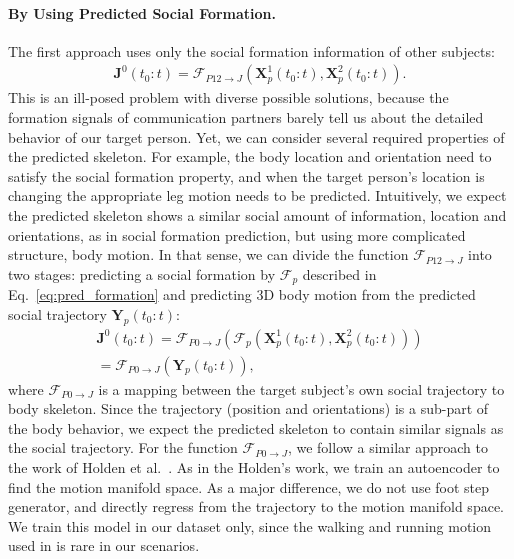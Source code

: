 \paragraph{By Using Predicted Social Formation.} The first approach uses only the social formation information of other subjects:
\begin{gather}	
\mathbf{J}^0(t_0:t) = \mathcal{F}_{P12\rightarrow J} \left( \mathbf{X}_p^1(t_0:t), \mathbf{X}_p^2(t_0:t) \right).
\end{gather}
This is an ill-posed problem with diverse possible solutions, because the formation signals of communication partners barely tell us about the detailed behavior of our target person. Yet, we can consider several required properties of the predicted skeleton. For example, the body location and orientation need to satisfy the social formation property, and when the target person's location is changing the appropriate leg motion needs to be predicted. Intuitively, we expect the predicted skeleton shows a similar social amount of information, location and orientations, as in social formation prediction, but using more complicated structure, body motion. In that sense, we can divide the function $\mathcal{F}_{P12\rightarrow J}$ into two stages: predicting a social formation by $\mathcal{F}_p$ described in Eq.~\ref{eq:pred_formation} and predicting 3D body motion from the predicted social trajectory $\mathbf{Y}_p (t_0:t)$:
\begin{gather}	
\mathbf{J}^0 (t_0:t) = \mathcal{F}_{P0\rightarrow J} \left(   \mathcal{F}_p \left( \mathbf{X}_p^1(t_0:t), \mathbf{X}_p^2(t_0:t) \right) \right) \nonumber \\ 
= \mathcal{F}_{P0\rightarrow J} \left( \mathbf{Y}_p (t_0:t)  \right),
\label{eq:pred_p2J}
\end{gather}
where $\mathcal{F}_{P0\rightarrow J}$ is a mapping between the target subject's own social trajectory to body skeleton. Since the trajectory (position and orientations) is a sub-part of the body behavior, we expect the predicted skeleton to contain similar signals as the social trajectory. For the function $\mathcal{F}_{P0\rightarrow J}$, we follow a similar approach to the work of Holden et al.~\cite{holden2016deep}. As in the Holden's work, we train an autoencoder to find the motion manifold space. As a major difference, we do not use foot step generator, and directly regress from the trajectory to the motion manifold space. We train this model in our dataset only, since the walking and running motion used in \cite{holden2016deep} is rare in our scenarios. 

